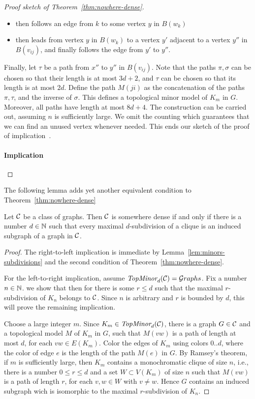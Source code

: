 \begin{proof}[Proof sketch of Theorem~\ref{thm:nowhere-dense}]
\begin{itemize}
  \item then follows an edge from $k$ to some vertex $y$ in $B(w_k)$
  
  \item then leads from vertex $y$ in $B(w_k)$  to  a vertex $y'$
  adjacent to a vertex $y''$ in $B(v_{ij})$,
  and finally follows the edge from $y'$ to $y''$.
\end{itemize}
Finally, let $\tau$ be a path from $x''$ to $y''$ in $B(v_{ij})$.
Note that the paths $\pi,\sigma$ can be chosen so that their length is at most $3d+2$, and $\tau$ can be chosen so that its length is at most $2d$.
Define the path $M(ji)$ as the concatenation of the paths
$\pi,\tau$, and the inverse of $\sigma$. This defines a topological minor model of $K_m$ in $G$. Moreover, all paths have length at most $8d+4$. The construction can be carried out, assuming $n$ is sufficiently large. We omit the counting which guarantees that we can find an unused vertex whenever needed. This ends our sketch of the proof of implication~.

\paragraph{Implication~}
\end{proof}

The following lemma adds yet another equivalent condition
to Theorem~\ref{thm:nowhere-dense}
\begin{lemma}\label{lem:somewhere-dense-subdivisions}
  Let ${\cal C}$ be a class of graphs.
  Then ${\cal C}$ is somewhere dense if and only if there is a number $d\in\mathbb{N}$ such that every maximal $d$-subdivision 
  of a clique is an induced subgraph of a graph in ${\cal C}$.
\end{lemma}
\begin{proof}The right-to-left implication is immediate by Lemma~\ref{lem:minors-subdivisions} and the second condition of Theorem~\ref{thm:nowhere-dense}.
  
  For the left-to-right implication,
  assume $\textit{TopMinor}_{d}({\cal C})={\mathcal G}\!\,raphs$.
   Fix a number $n\in\mathbb{N}$.
  we show that then for there is some $r\le d$ such that  
  the maximal $r$-subdivision of $K_n$ belongs to ${\cal C}$. 
  Since $n$ is arbitrary and $r$ is bounded by $d$, this will prove the remaining implication. 
  
  Choose a large integer $m$. Since $K_m\in\textit{TopMinor}_{d}({\cal C})$, there is a graph $G\in {\cal C}$ and a topological model $M$ of $K_m$
  in $G$, such that $M(vw)$ is a path of length at most $d$,
  for each $vw\in E(K_m)$.
  Color the edges of $K_m$ using colors $0..d$, where 
  the color of edge $e$ is the length of the path $M(e)$ in $G$. By Ramsey's theorem, if $m$ is sufficiently large,
  then $K_m$ contains a monochromatic clique of size $n$,
  i.e., there is a number $0\le r\le d$ and a set $W\subset V(K_m)$ of size $n$
  such that $M(vw)$ is a path of length $r$, for each $v,w\in W$ with $v\neq w$. Hence $G$ contains an induced subgraph wich is isomorphic to the maximal $r$-subdivision of $K_n$.
\end{proof}

